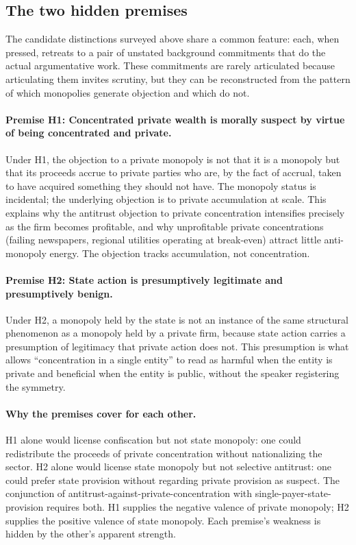 \documentclass[11pt]{article}
\begin{document}
\subsection{The two hidden premises}

The candidate distinctions surveyed above share a common feature: each, when pressed, retreats to a pair of unstated background commitments that do the actual argumentative work. These commitments are rarely articulated because articulating them invites scrutiny, but they can be reconstructed from the pattern of which monopolies generate objection and which do not.

\paragraph{Premise H1: Concentrated private wealth is morally suspect by virtue of being concentrated and private.}
Under H1, the objection to a private monopoly is not that it is a monopoly but that its proceeds accrue to private parties who are, by the fact of accrual, taken to have acquired something they should not have. The monopoly status is incidental; the underlying objection is to private accumulation at scale. This explains why the antitrust objection to private concentration intensifies precisely as the firm becomes profitable, and why unprofitable private concentrations (failing newspapers, regional utilities operating at break-even) attract little anti-monopoly energy. The objection tracks accumulation, not concentration.

\paragraph{Premise H2: State action is presumptively legitimate and presumptively benign.}
Under H2, a monopoly held by the state is not an instance of the same structural phenomenon as a monopoly held by a private firm, because state action carries a presumption of legitimacy that private action does not. This presumption is what allows ``concentration in a single entity'' to read as harmful when the entity is private and beneficial when the entity is public, without the speaker registering the symmetry.

\paragraph{Why the premises cover for each other.}
H1 alone would license confiscation but not state monopoly: one could redistribute the proceeds of private concentration without nationalizing the sector. H2 alone would license state monopoly but not selective antitrust: one could prefer state provision without regarding private provision as suspect. The conjunction of antitrust-against-private-concentration with single-payer-state-provision requires both. H1 supplies the negative valence of private monopoly; H2 supplies the positive valence of state monopoly. Each premise's weakness is hidden by the other's apparent strength.
\end{document}
